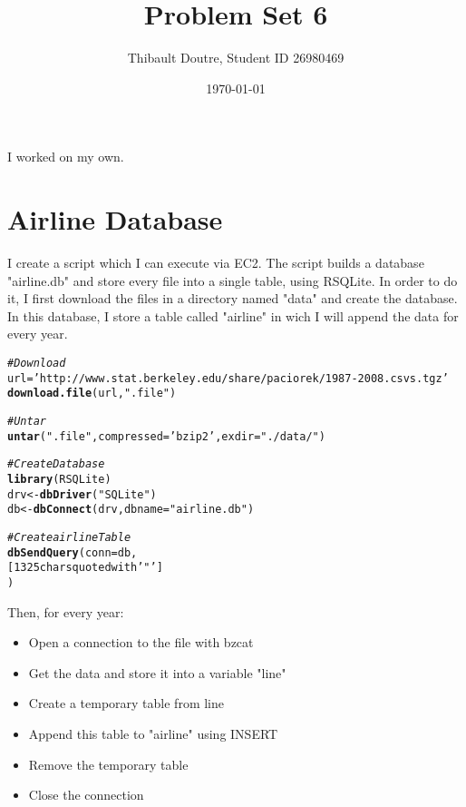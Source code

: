\documentclass{llncs}\usepackage[]{graphicx}\usepackage[]{color}
\makeatletter
\newcommand{\hlstr}[1]{\textcolor[rgb]{0.192,0.494,0.8}{#1}}%
\newcommand{\hlcom}[1]{\textcolor[rgb]{0.678,0.584,0.686}{\textit{#1}}}%
\newcommand{\hlstd}[1]{\textcolor[rgb]{0.345,0.345,0.345}{#1}}%
\newcommand{\hlkwb}[1]{\textcolor[rgb]{0.69,0.353,0.396}{#1}}%
\newcommand{\hlkwc}[1]{\textcolor[rgb]{0.333,0.667,0.333}{#1}}%
\newcommand{\hlkwd}[1]{\textcolor[rgb]{0.737,0.353,0.396}{\textbf{#1}}}%
\newenvironment{kframe}{%
 \def\at@end@of@kframe{}%
 \ifinner\ifhmode%
  \def\at@end@of@kframe{\end{minipage}}%
  \begin{minipage}{\columnwidth}%
 \fi\fi%
 \def\FrameCommand##1{\hskip\@totalleftmargin \hskip-\fboxsep
 \colorbox{shadecolor}{##1}\hskip-\fboxsep
     \hskip-\linewidth \hskip-\@totalleftmargin \hskip\columnwidth}%
 \MakeFramed {\advance\hsize-\width
   \@totalleftmargin\z@ \linewidth\hsize
   \@setminipage}}%
 {\par\unskip\endMakeFramed%
 \at@end@of@kframe}
\newenvironment{knitrout}{}{} %
\makeatother
\begin{document}
\title{Problem Set 6}
\author{Thibault Doutre, Student ID 26980469}
\date{\today}
\maketitle
\bigbreak
\noindent
I worked on my own.
\section{Airline Database}
I create a script which I can execute via EC2. The script builds a database "airline.db" and store every file into a single table, using RSQLite. In order to do it, I first download the files in a directory named "data" and create the database. In this database, I store a table called "airline" in wich I will append the data for every year.
\begin{knitrout}
\color{fgcolor}\begin{kframe}
\begin{alltt}
\hlcom{#Download}
\hlstd{url} \hlkwb{=} \hlstr{'http://www.stat.berkeley.edu/share/paciorek/1987-2008.csvs.tgz'}
\hlkwd{download.file}\hlstd{(url,} \hlstr{".file"}\hlstd{)}

\hlcom{# Untar}
\hlkwd{untar}\hlstd{(}\hlstr{".file"}\hlstd{,} \hlkwc{compressed} \hlstd{=} \hlstr{'bzip2'}\hlstd{,} \hlkwc{exdir} \hlstd{=} \hlstr{"./data/"}\hlstd{)}

\hlcom{# Create Database}
\hlkwd{library}\hlstd{(RSQLite)}
\hlstd{drv} \hlkwb{<-} \hlkwd{dbDriver}\hlstd{(}\hlstr{"SQLite"}\hlstd{)}
\hlstd{db} \hlkwb{<-} \hlkwd{dbConnect}\hlstd{(drv,} \hlkwc{dbname} \hlstd{=} \hlstr{"airline.db"}\hlstd{)}

\hlcom{# Create airline Table}
\hlkwd{dbSendQuery}\hlstd{(}\hlkwc{conn} \hlstd{= db,}
            \hlstr{[1325 chars quoted with '"']}
\hlstd{)}
\end{alltt}
\end{kframe}
\end{knitrout}
Then, for every year:
\begin{itemize}
\item Open a connection to the file with bzcat 
\item Get the data and store it into a variable "line"
\item Create a temporary table from line
\item Append this table to "airline" using INSERT
\item Remove the temporary table
\item Close the connection
\end{itemize}
\end{document}
